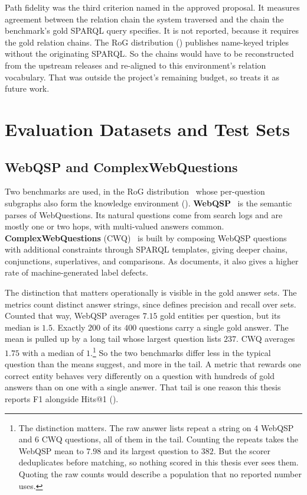 \label{sec:metrics-not-run}%
Path fidelity was the third criterion named in the approved proposal. It
measures agreement between the relation chain the system traversed and the chain
the benchmark's gold SPARQL query specifies. It is not reported, because it
requires the gold relation chains. The RoG distribution ()
publishes name-keyed triples without the originating SPARQL. So the chains would
have to be reconstructed from the upstream releases and re-aligned to this
environment's relation vocabulary. That was outside the project's remaining
budget, so  treats it as future work.

\section{Evaluation Datasets and Test Sets}\label{sec:test-sets}

\subsection{WebQSP and ComplexWebQuestions}

Two benchmarks are used, in the RoG distribution~\cite{luo2024reasoning}
whose per-question
subgraphs also form the knowledge environment ().
\textbf{WebQSP}~\cite{yih2016value} is the semantic parses of WebQuestions. Its
natural questions come from search logs and are mostly one or two hops, with
multi-valued answers common. \textbf{ComplexWebQuestions}
(CWQ)~\cite{talmor2018web} is built by composing WebQSP questions with
additional constraints through SPARQL templates, giving deeper chains,
conjunctions, superlatives, and comparisons. As 
documents, it also gives a higher rate of machine-generated label defects.

The distinction that matters operationally is visible in the gold answer sets.
The metrics count distinct answer strings, since  defines
precision and recall over sets. Counted that way, WebQSP averages $7.15$ gold
entities per question, but its median is $1.5$. Exactly $200$ of its $400$
questions carry a single gold answer. The mean is pulled up by a long tail whose
largest question lists $237$. CWQ averages $1.75$ with a median of
$1$.\footnote{The distinction matters. The raw answer lists repeat a string on
$4$ WebQSP and $6$ CWQ questions, all of them in the tail. Counting the repeats
takes the WebQSP mean to $7.98$ and its largest question to $382$. But the
scorer deduplicates before matching, so nothing scored in this thesis ever sees
them. Quoting the raw counts would describe a population that no reported number
uses.} So the two benchmarks differ less in the typical question than the means
suggest, and more in the tail. A metric that rewards one correct entity behaves
very differently on a question with hundreds of gold answers than on one with a
single answer. That tail is one reason this thesis reports F1 alongside Hits@1
().

